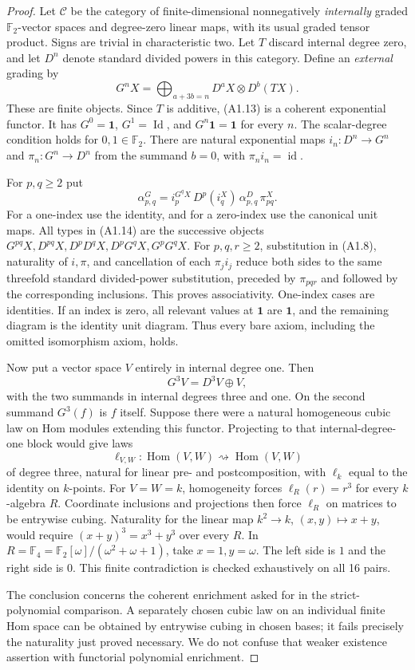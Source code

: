 \begin{proof}
Let $\mathcal C$ be the category of finite-dimensional nonnegatively
\emph{internally} graded $\mathbb F_2$-vector spaces and degree-zero
linear maps, with its usual graded tensor product. Signs are trivial
in characteristic two. Let $T$ discard internal degree zero, and let
$D^n$ denote standard divided powers in this category. Define an
\emph{external} grading by
\[
 G^nX=\bigoplus_{a+3b=n}D^aX\otimes D^b(TX).
 \tag{A1.13}
\]
These are finite objects. Since $T$ is additive, (A1.13) is a coherent
exponential functor. It has $G^0=\mathbf1$, $G^1=\operatorname{Id}$,
and $G^n\mathbf1=\mathbf1$ for every $n$. The scalar-degree condition
holds for $0,1\in\mathbb F_2$. There are natural exponential maps
$i_n:D^n\to G^n$ and $\pi_n:G^n\to D^n$ from the summand $b=0$,
with $\pi_n i_n=\operatorname{id}$.

For $p,q\geq2$ put
\[
 \alpha^G_{p,q}=
 i_p^{G^qX}\,D^p(i_q^X)\,\alpha^D_{p,q}\,\pi_{pq}^X.
 \tag{A1.14}
\]
For a one-index use the identity, and for a zero-index use the
canonical unit maps. All types in (A1.14) are the successive objects
$G^{pq}X,D^{pq}X,D^pD^qX,D^pG^qX,G^pG^qX$.
For $p,q,r\geq2$, substitution in (A1.8), naturality of $i,\pi$,
and cancellation of each $\pi_j i_j$ reduce both sides to the same
threefold standard divided-power substitution, preceded by
$\pi_{pqr}$ and followed by the corresponding inclusions. This proves
associativity. One-index cases are identities. If an index is zero,
all relevant values at $\mathbf1$ are $\mathbf1$, and the remaining
diagram is the identity unit diagram. Thus every bare axiom, including
the omitted isomorphism axiom, holds.

Now put a vector space $V$ entirely in internal degree one. Then
\[
 G^3V=D^3V\oplus V,
\]
with the two summands in internal degrees three and one. On the second
summand $G^3(f)$ is $f$ itself. Suppose there were a natural homogeneous
cubic law on Hom modules extending this functor. Projecting to that
internal-degree-one block would give laws
\[
 \ell_{V,W}:\operatorname{Hom}(V,W)\rightsquigarrow
             \operatorname{Hom}(V,W)
\]
of degree three, natural for linear pre- and postcomposition, with
$\ell_k$ equal to the identity on $k$-points. For $V=W=k$,
homogeneity forces $\ell_R(r)=r^3$ for every $k$-algebra $R$.
Coordinate inclusions and projections then force $\ell_R$ on matrices
to be entrywise cubing. Naturality for the linear map
$k^2\to k$, $(x,y)\mapsto x+y$, would require
$(x+y)^3=x^3+y^3$ over every $R$. In
$R=\mathbb F_4=\mathbb F_2[\omega]/(\omega^2+\omega+1)$,
take $x=1,y=\omega$. The left side is $1$ and the right side is $0$.
This finite contradiction is checked exhaustively on all 16 pairs.

The conclusion concerns the coherent enrichment asked for in the
strict-polynomial comparison. A separately chosen cubic law on an
individual finite Hom space can be obtained by entrywise cubing in
chosen bases; it fails precisely the naturality just proved necessary.
We do not confuse that weaker existence assertion with functorial
polynomial enrichment.
\end{proof}

